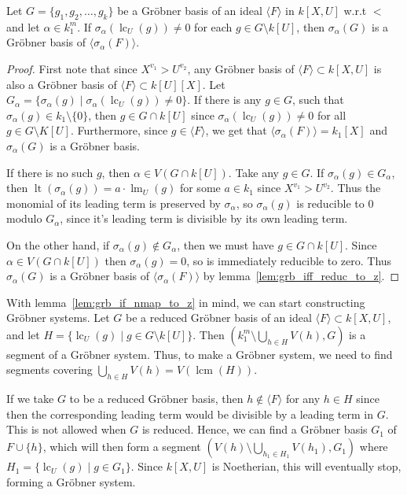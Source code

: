 \documentclass[a4paper, 12pt]{article}
\DeclareMathOperator{\LT}{lt}
\DeclareMathOperator{\LM}{lm}
\DeclareMathOperator{\LC}{lc}
\DeclareMathOperator{\lcm}{lcm}
\theoremstyle{changedot}
\theoremstyle{changedotbreak}
\theoremstyle{nonumberplain}
\newtheorem{proof}{Proof}
\begin{document}
\begin{lemma}\label{lem:grb_if_nmap_to_z}
  Let $G = \{g_{1}, g_{2}, \dots, g_{k}\}$ be a Gröbner basis of an ideal $\langle F \rangle$ in $k[X, U]$ w.r.t $<$ and let $\alpha \in k_{1}^{m}$. If $\sigma_{\alpha}(\LC_{U}(g)) \neq 0$ for each $g \in G \setminus k[U]$, then $\sigma_{\alpha}(G)$ is a Gröbner basis of $\langle \sigma_{\alpha}(F) \rangle$.
\end{lemma}
\begin{proof}
  First note that since $X^{v_{1}} > U^{v_{2}}$, any Gröbner basis of $\langle F \rangle \subset k[X, U]$ is also a Gröbner basis of $\langle F \rangle \subset k[U][X]$. Let $G_{\alpha} = \{\sigma_{\alpha}(g) \mid \sigma_{\alpha}(\LC_{U}(g)) \neq 0\}$. If there is any $g \in G$, such that $\sigma_{\alpha}(g) \in k_{1} \setminus \{0\}$, then $g \in G \cap k[U]$ since $\sigma_{\alpha}(\LC_{U}(g)) \neq 0$ for all $g \in G \setminus K[U]$. Furthermore, since $g \in \langle F \rangle$, we get that $\langle \sigma_{\alpha}(F) \rangle = k_{1}[X]$ and $\sigma_{\alpha}(G)$ is a Gröbner basis.

  If there is no such $g$, then $\alpha \in V(G \cap k[U])$. Take any $g \in G$. If $\sigma_{\alpha}(g) \in G_{\alpha}$, then $\LT(\sigma_{\alpha}(g)) = a \cdot \LM_{U}(g)$ for some $a \in k_{1}$ since $X^{v_{1}} > U^{v_{2}}$. Thus the monomial of its leading term is preserved by $\sigma_{\alpha}$, so $\sigma_{\alpha}(g)$ is reducible to $0$ modulo $G_{\alpha}$, since it's leading term is divisible by its own leading term.

  On the other hand, if $\sigma_{\alpha}(g) \notin G_{\alpha}$, then we must have $g \in G \cap k[U]$. Since $\alpha \in V(G \cap k[U])$ then $\sigma_{\alpha}(g) = 0$, so is immediately reducible to zero. Thus $\sigma_{\alpha}(G)$ is a Gröbner basis of $\langle \sigma_{\alpha}(F) \rangle$ by lemma~\ref{lem:grb_iff_reduc_to_z}.
\end{proof}

With lemma~\ref{lem:grb_if_nmap_to_z} in mind, we can start constructing Gröbner systems. Let $G$ be a reduced Gröbner basis of an ideal $\langle F \rangle \subset k[X, U]$, and let $H = \{\LC_{U}(g) \mid g \in G \setminus k[U]\}$. Then $\left(k_{1}^{m} \setminus \bigcup_{h \in H} V(h), G\right)$ is a segment of a Gröbner system. Thus, to make a Gröbner system, we need to find segments covering $\bigcup_{h \in H} V(h) = V(\lcm(H))$.

If we take $G$ to be a reduced Gröbner basis, then $h \notin \langle F \rangle$ for any $h \in H$ since then the corresponding leading term would be divisible by a leading term in $G$. This is not allowed when $G$ is reduced. Hence, we can find a Gröbner basis $G_{1}$ of $F \cup \{h\}$, which will then form a segment $(V(h) \setminus \bigcup_{h_{1} \in H_{1}} V(h_{1}), G_{1})$ where $H_{1} = \{\LC_{U}(g) \mid g \in G_{1}\}$. Since $k[X, U]$ is Noetherian, this will eventually stop, forming a Gröbner system.
\end{document}
